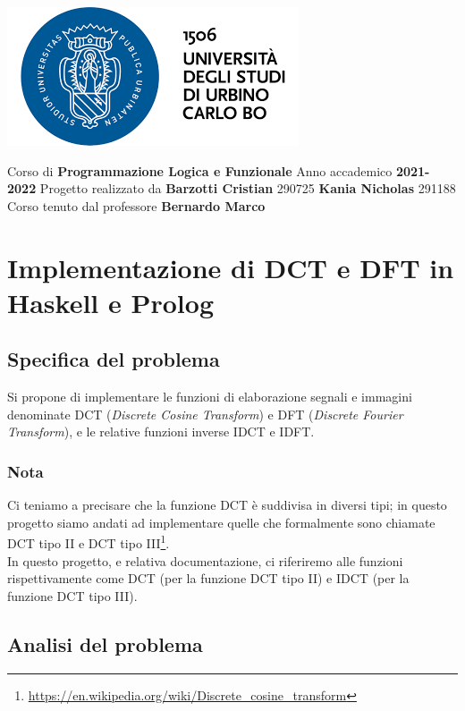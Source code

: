 \documentclass{report}
\begin{document}
	\centerline{\includegraphics{logo}}
	\bigbreak

	\begin{center}
		Corso di
        \vskip 0.2cm
		\large{\textbf{Programmazione Logica e Funzionale}}
		\vskip 2cm
		Anno accademico
        \vskip 0.2cm
 		\textbf{2021-2022}
		\vskip 2cm
		Progetto realizzato da
        \vskip 0.2cm
		\textbf{Barzotti Cristian}
        \vskip 0.1cm 290725
        \vskip 0.2cm
        \textbf{Kania Nicholas} 
        \vskip 0.1cm 
        291188
		\vfill
		Corso tenuto dal professore
        \vskip 0.2cm
		\large{\textbf{Bernardo Marco}}
	\end{center}
	
	\part*{Implementazione di DCT e DFT in Haskell e Prolog}
	\tableofcontents %

	
	\chapter{Specifica del problema}
	Si propone di implementare le funzioni di elaborazione segnali e immagini denominate DCT
	(\textit{Discrete Cosine Transform}) e DFT (\textit{Discrete Fourier Transform}), 
	e le relative funzioni inverse IDCT e IDFT. \\
	\section*{Nota}
	Ci teniamo a precisare che la funzione DCT è suddivisa in diversi tipi; in questo progetto siamo andati ad implementare quelle che formalmente sono chiamate DCT tipo II e DCT tipo III\footnote{\url{https://en.wikipedia.org/wiki/Discrete_cosine_transform}}.\\ 
	In questo progetto, e relativa documentazione, ci riferiremo alle funzioni rispettivamente come DCT (per la funzione DCT tipo II) e IDCT (per la funzione DCT tipo III).
	
	\chapter{Analisi del problema}
\end{document}
